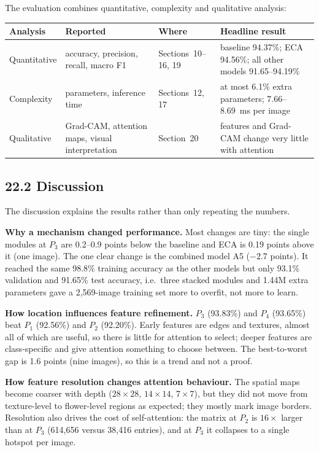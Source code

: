 \documentclass[11pt]{article}
\newcommand{\qbox}[1]{\begin{center}\fbox{\,#1\,}\end{center}}
\begin{document}
The evaluation combines quantitative, complexity and qualitative analysis:

\qbox{Quantitative + Computational + Qualitative}

\begin{center}
\small
\begin{tabular}{|p{2.2cm}|p{3.6cm}|p{3cm}|p{6.6cm}|}
\hline
Analysis & Reported & Where & Headline result\\
\hline
Quantitative & accuracy, precision, recall, macro F1 & Sections~10--16, 19 & baseline 94.37\%; ECA 94.56\%; all other models 91.65--94.19\%\\
Complexity & parameters, inference time & Sections~12, 17 & at most 6.1\% extra parameters; 7.66--8.69~ms per image\\
Qualitative & Grad-CAM, attention maps, visual interpretation & Section~20 & features and Grad-CAM change very little with attention\\
\hline
\end{tabular}
\end{center}

\subsection*{22.2 Discussion}

The discussion explains the results rather than only repeating the numbers.

\textbf{Why a mechanism changed performance.} Most changes are tiny: the
single modules at $P_3$ are 0.2--0.9 points below the baseline and ECA is
0.19 points above it (one image). The one clear change is the combined model
A5 ($-2.7$ points). It reached the same 98.8\% training accuracy as the other
models but only 93.1\% validation and 91.65\% test accuracy, i.e.\ three
stacked modules and 1.44M extra parameters gave a 2{,}569-image training set
more to overfit, not more to learn.

\textbf{How location influences feature refinement.} $P_3$ (93.83\%) and
$P_4$ (93.65\%) beat $P_1$ (92.56\%) and $P_2$ (92.20\%). Early features
are edges and textures, almost all of which are useful, so there is little
for attention to select; deeper features are class-specific and give
attention something to choose between. The best-to-worst gap is 1.6 points
(nine images), so this is a trend and not a proof.

\textbf{How feature resolution changes attention behaviour.} The spatial maps
become coarser with depth ($28\times28$, $14\times14$, $7\times7$), but they
did not move from texture-level to flower-level regions as expected; they
mostly mark image borders. Resolution also drives the cost of
self-attention: the matrix at $P_2$ is $16\times$ larger than at $P_3$
(614{,}656 versus 38{,}416 entries), and at $P_3$ it collapses to a single
hotspot per image.
\end{document}
